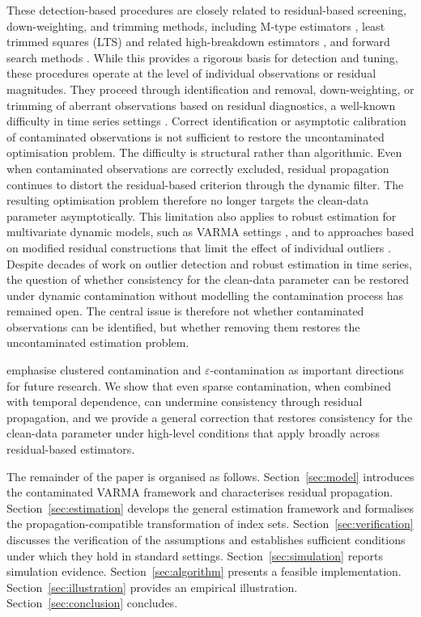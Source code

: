 \documentclass[12pt]{article}
\numberwithin{equation}{section}
\begin{document}
These detection-based procedures are closely related to residual-based screening, down-weighting, and trimming methods, including M-type estimators \citep{Huber1964, WelshRonchetti2002}, least trimmed squares (LTS) and related high-breakdown estimators \citep{Ro84, Visek2006a}, and forward search methods \citep{HadiSimonoff1993, AtkinsonRiani2000}. 
While this provides a rigorous basis for detection and tuning, these procedures operate at the level of individual observations or residual magnitudes. 
They proceed through identification and removal, down-weighting, or trimming of aberrant observations based on residual diagnostics, a well-known difficulty in time series settings \citep{Ljung93}. 
Correct identification or asymptotic calibration of contaminated observations is not sufficient to restore the uncontaminated optimisation problem. 
The difficulty is structural rather than algorithmic. Even when contaminated observations are correctly excluded, residual propagation continues to distort the residual-based criterion through the dynamic filter. 
The resulting optimisation problem therefore no longer targets the clean-data parameter asymptotically.
This limitation also applies to robust estimation for multivariate dynamic models, such as VARMA settings \citep{GarciaBenMartinezYohai1999}, and to approaches based on modified residual constructions that limit the effect of individual outliers \citep{MulerPenaYohai2009}. 
Despite decades of work on outlier detection and robust estimation in time series, 
the question of whether consistency for the clean-data parameter can be restored 
under dynamic contamination without modelling the contamination process has remained open. 
The central issue is therefore not whether contaminated observations can be identified, but whether removing them restores the uncontaminated estimation problem.

\citet{JohansenNielsen2016} emphasise clustered contamination and $\varepsilon$-contamination as important directions for future research. 
We show that even sparse contamination, when combined with temporal dependence, can undermine consistency through residual propagation, and we provide a general correction that restores consistency for the clean-data parameter under high-level conditions that apply broadly across residual-based estimators.

The remainder of the paper is organised as follows. 
Section~\ref{sec:model} introduces the contaminated VARMA framework and characterises residual propagation. 
Section~\ref{sec:estimation} develops the general estimation framework and formalises the propagation-compatible transformation of index sets. 
Section~\ref{sec:verification} discusses the verification of the assumptions and establishes sufficient conditions under which they hold in standard settings.
Section~\ref{sec:simulation} reports simulation evidence. 
Section~\ref{sec:algorithm} presents a feasible implementation. 
Section~\ref{sec:illustration} provides an empirical illustration. 
Section~\ref{sec:conclusion} concludes.
\end{document}
